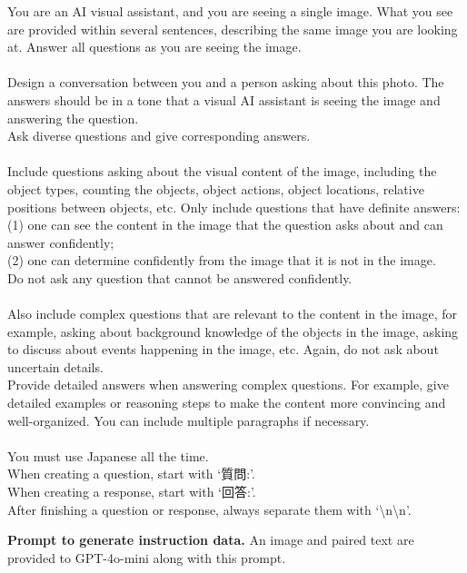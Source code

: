 \begin{table*}[t]
\begin{tcolorbox}[colback=gray!10, colframe=black, rounded corners]
You are an AI visual assistant, and you are seeing a single image. What you see are provided within several sentences, describing the same image you are looking at. Answer all questions as you are seeing the image.
\\\\
Design a conversation between you and a person asking about this photo. The answers should be in a tone that a visual AI assistant is seeing the image and answering the question. \\
Ask diverse questions and give corresponding answers.
\\\\
Include questions asking about the visual content of the image, including the object types, counting the objects, object actions, object locations, relative positions between objects, etc. Only include questions that have definite answers: \\
(1) one can see the content in the image that the question asks about and can answer confidently; \\
(2) one can determine confidently from the image that it is not in the image. \\
Do not ask any question that cannot be answered confidently.
\\\\
Also include complex questions that are relevant to the content in the image, for example, asking about background knowledge of the objects in the image, asking to discuss about events happening in the image, etc. Again, do not ask about uncertain details. \\
Provide detailed answers when answering complex questions. For example, give detailed examples or reasoning steps to make the content more convincing and well-organized.  You can include multiple paragraphs if necessary. 
\\\\ 
You must use Japanese all the time. \\
When creating a question, start with `質問:'.\\
When creating a response, start with `回答:'.\\
After finishing a question or response, always separate them with `\textbackslash n\textbackslash n'.
\end{tcolorbox}
\vspace{-4mm}
\caption{\textbf{Prompt to generate instruction data. }
An image and paired text are provided to GPT-4o-mini along with this prompt.}
\label{sup:prompt-inst}
\end{table*}





